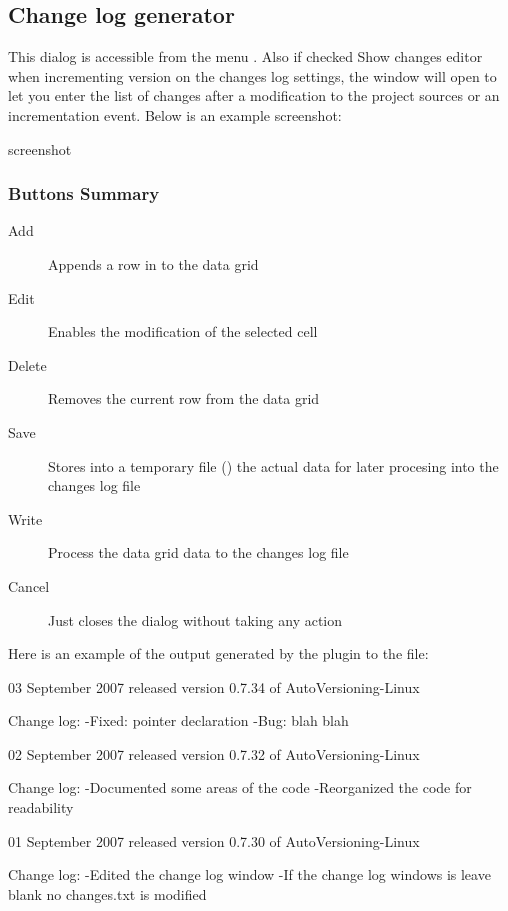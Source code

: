\subsection{Change log generator}

This dialog is accessible from the menu . Also if checked Show changes editor when incrementing version on the changes log settings, the window will open to let you enter the list of changes after a modification to the project sources or an incrementation event. Below is an example screenshot:

screenshot
\subsubsection{Buttons Summary}

\begin{description}
\item[Add] Appends a row in to the data grid
\item[Edit] Enables the modification of the selected cell
\item[Delete] Removes the current row from the data grid
\item[Save] Stores into a temporary file () the actual data for later procesing into the changes log file
\item[Write] Process the data grid data to the changes log file
\item[Cancel] Just closes the dialog without taking any action
\end{description}

Here is an example of the output generated by the plugin to the  file:

\begin{code}
03 September 2007
   released version 0.7.34 of AutoVersioning-Linux

     Change log:
        -Fixed: pointer declaration
        -Bug: blah blah

02 September 2007
   released version 0.7.32 of AutoVersioning-Linux

     Change log:
        -Documented some areas of the code
        -Reorganized the code for readability

01 September 2007
   released version 0.7.30 of AutoVersioning-Linux

     Change log:
        -Edited the change log window
        -If the change log windows is leave blank no changes.txt is modified
\end{code}
